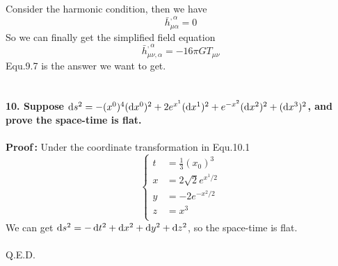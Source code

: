 \documentclass[12pt]{article}
\begin{document}
Consider the harmonic condition, then we have
\begin{equation}
\bar h^{,\alpha}_{\mu\alpha}=0
		\tag{9.6}
\end{equation}
So we can finally get the simplified field equation
\begin{equation}
\bar h^{,\alpha}_{\mu\nu,\alpha}=-16\pi GT_{\mu\nu}
		\tag{9.7}
\end{equation}
Equ.9.7 is the answer we want to get.
~\\
~\\
~\\
\textbf{10. Suppose $\mathop{}\!\mathrm{d} s^{2}=-(x^{0})^{4}(\mathop{}\!\mathrm{d} x^{0})^{2}+2e^{x^{1}}(\mathop{}\!\mathrm{d} x^{1})^{2}+e^{-x^{2}}(\mathop{}\!\mathrm{d} x^{2})^{2}+(\mathop{}\!\mathrm{d} x^{3})^{2}$, and prove the space-time is flat.} \\		
~\\
\textbf{Proof\,:} Under the coordinate transformation in Equ.10.1
\begin{equation}
\left\{		%
\begin{aligned}
\displaystyle 
t &=\frac{1}{3}(x_{0})^{3}\\
x &=2\sqrt{2}e^{x^{1}/2}\\
y &=-2e^{-x^{2}/2}\\
z &=x^{3}\\
\end{aligned}
\right.	%
		\tag{10.1}
\end{equation}
We can get $\mathop{}\!\mathrm{d} s^{2}=-\mathop{}\!\mathrm{d} t^{2}+\mathop{}\!\mathrm{d} x^{2}+\mathop{}\!\mathrm{d} y^{2}+\mathop{}\!\mathrm{d} z^{2}$, so the space-time is flat.\\
~\\
Q.E.D.
~\\
~\\
\end{document}
